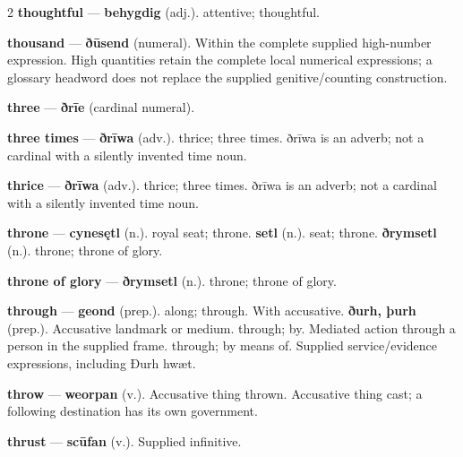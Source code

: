 \begin{multicols}{2}
\textbf{thoughtful} — \textbf{behygdig} (adj.). attentive; thoughtful.\par
\textbf{thousand} — \textbf{ðūsend} (numeral). Within the complete supplied high-number expression. High quantities retain the complete local numerical expressions; a glossary headword does not replace the supplied genitive/counting construction.\par
\textbf{three} — \textbf{ðrīe} (cardinal numeral).\par
\textbf{three times} — \textbf{ðrīwa} (adv.). thrice; three times. ðrīwa is an adverb; not a cardinal with a silently invented time noun.\par
\textbf{thrice} — \textbf{ðrīwa} (adv.). thrice; three times. ðrīwa is an adverb; not a cardinal with a silently invented time noun.\par
\textbf{throne} — \textbf{cynesętl} (n.). royal seat; throne. \textbf{setl} (n.). seat; throne. \textbf{ðrymsetl} (n.). throne; throne of glory.\par
\textbf{throne of glory} — \textbf{ðrymsetl} (n.). throne; throne of glory.\par
\textbf{through} — \textbf{geond} (prep.). along; through. With accusative. \textbf{ðurh, þurh} (prep.). Accusative landmark or medium. through; by. Mediated action through a person in the supplied frame. through; by means of. Supplied service/evidence expressions, including Ðurh hwæt.\par
\textbf{throw} — \textbf{weorpan} (v.). Accusative thing thrown. Accusative thing cast; a following destination has its own government.\par
\textbf{thrust} — \textbf{scūfan} (v.). Supplied infinitive.\par

\end{multicols}
